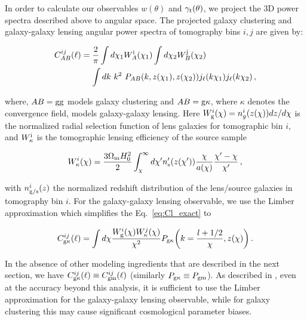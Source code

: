 \documentclass[aps, prd,twocolumn,superscriptaddress,nofootinbib,preprintnumbers]{revtex4-1}
\newcommand{\gammat}{\ensuremath{\gamma_{\rm t}(\theta)}}
\newcommand{\wtheta}{\ensuremath{w(\theta)}}
\begin{document}
In order to calculate our observables $\wtheta$ and $\gammat$, we project the 3D power spectra described above to angular space. %
The projected galaxy clustering and galaxy-galaxy lensing angular power spectra of tomography bins $i,j$ are given by:
\begin{linenomath*}
\begin{align}\label{eq:Cl_exact}
    C^{ij}_{AB}(\ell) &= \frac{2}{\pi} \int d\chi_1 W^{\rm i}_{A}(\chi_1) \int d\chi_2 W^{\rm j}_{B}(\chi_2) \nonumber \\
    &\mathrel{\phantom{=}} \int dk \ k^2 \ P_{ AB}(k,z(\chi_1),z(\chi_2)) j_{\ell}(k \chi_1) j_{\ell}(k \chi_2)\,,
\end{align}
\end{linenomath*}
where, $AB = \rm{gg}$ models galaxy clustering and $AB={\rm g\kappa}$, where $\kappa$ denotes the convergence field, models galaxy-galaxy lensing. Here $W^{i}_{\rm g}(\chi) = n^{i}_g (z(\chi))dz/d\chi$ is the normalized radial selection function of lens galaxies for tomographic bin $i$, and $W^{\rm i}_{\kappa}$ is the tomographic lensing efficiency of the source sample
\begin{linenomath*}
\begin{equation}
    W^{i}_{\rm \kappa} (\chi)= \frac{3\Omega_{\rm m} H_0^2}{2} \int_{\chi}^{\infty} d\chi' n'_{\rm s} (z(\chi'))\frac{\chi}{a(\chi)}\frac{\chi' - \chi}{\chi'}\,,
\end{equation}
\end{linenomath*}
with $n_{\rm{g/s}}^i(z)$ the normalized redshift distribution of the lens/source galaxies in tomography bin $i$. 
For the galaxy-galaxy lensing observable, we use the Limber approximation \citep{Limber:53, LoVerde:2008re} which simplifies the Eq.~\ref{eq:Cl_exact} to
\begin{linenomath*}
\begin{equation}\label{eq:Cl_limber}
    C^{ij}_{\rm g\kappa}(\ell)  = \int d\chi \frac{W^{i}_{\rm g}(\chi) W^{j}_{\rm \kappa}(\chi)}{\chi^2} P_{\rm g\kappa}\bigg(k=\frac{l + 1/2}{\chi},z(\chi)\bigg)\,.
\end{equation}
\end{linenomath*}
In the absence of other modeling ingredients that are described in the next section, we have $C^{ij}_{\rm g\kappa}(\ell) \equiv C^{ij}_{\rm gm}(\ell)$ (similarly $P_{\rm g\kappa} \equiv P_{\rm gm}$). As described in \citet{Fang_nonlimber}, even at the accuracy beyond this analysis, it is sufficient to use  the Limber approximation for the galaxy-galaxy lensing observable, while for galaxy clustering this may cause significant cosmological parameter biases. 
\end{document}
